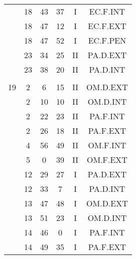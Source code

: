\documentclass[12pt, a4paper]{article}
\begin{document}
\begin{multicols}{3}
{\begin{tabular}{c c c c c c}
	 	 	 	 & 18 & 43 & 37 & I & EC.F.INT\\%
	 	 	 	 & 18 & 47 & 12 & I & EC.F.EXT\\%
	 	 	 	 & 18 & 47 & 52 & I & EC.F.PEN\\%
	 	 	 	 & 23 & 34 & 25 & II & PA.D.EXT\\%
	 	 	 	 & 23 & 38 & 20 & II & PA.D.INT\\%
	 	 	 	 & & & & & \\%
	 	 	 	19 & 2 & 6 & 15 & II & OM.D.EXT\\%
	 	 	 	 & 2 & 10 & 10 & II & OM.D.INT\\%
	 	 	 	 & 2 & 22 & 23 & II & PA.F.INT\\%
	 	 	 	 & 2 & 26 & 18 & II & PA.F.EXT\\%
	 	 	 	 & 4 & 56 & 49 & II & OM.F.INT\\%
	 	 	 	 & 5 & 0 & 39 & II & OM.F.EXT\\%
	 	 	 	 & 12 & 29 & 27 & I & PA.D.EXT\\%
	 	 	 	 & 12 & 33 & 7 & I & PA.D.INT\\%
	 	 	 	 & 13 & 47 & 48 & I & OM.D.EXT\\%
	 	 	 	 & 13 & 51 & 23 & I & OM.D.INT\\%
	 	 	 	 & 14 & 46 & 0 & I & PA.F.INT\\%
	 	 	 	 & 14 & 49 & 35 & I & PA.F.EXT\\%
	 	 \end{tabular}
 	}
\end{multicols}
\end{document}
